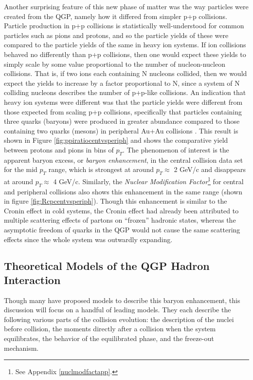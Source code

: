 Another surprising feature of this new phase of matter was the way particles were created from the QGP, namely how it differed from simpler p+p collisions. Particle production in p+p collisions is statistically well-understood for common particles such as pions and protons, and so the particle yields of these were compared to the particle yields of the same in heavy ion systems. If ion collisions behaved no differently than p+p collisions, then one would expect these yields to simply scale by some value proportional to the number of nucleon-nucleon collisions. That is, if two ions each containing N nucleons collided, then we would expect the yields to increase by a factor proportional to N, since a system of N colliding nucleons describes the number of p+p-like collisions. An indication that heavy ion systems were different was that the particle yields were different from those expected from scaling p+p collisions, specifically that particles containing three quarks (baryons) were produced in greater abundance compared to those containing two quarks (mesons) in peripheral Au+Au collisions \citep{PhysRevLett.97.152301}. This result is shown in Figure \ref{fig:ppiratiocentvsperiph} and shows the comparative yield between protons and pions in bins of $p_{T}$. The phenomenon of interest is the apparent baryon excess, or \textit{baryon enhancement}, in the central collision data set for the mid $p_{T}$ range, which is strongest at around $p_{T}\approx$ 2 GeV/c and disappears at around $p_{T}\approx$ 4 GeV/c. Similarly, the \textit{Nuclear Modification Factor}\footnote{See Appendix \ref{nuclmodfactapp}.} for central and peripheral collisions also shows this enhancement in the same range (shown in figure \ref{fig:Rcpcentvsperiph}). Though this enhancement is similar to the Cronin effect in cold systems, the Cronin effect had already been attributed to multiple scattering effects of partons on ``frozen'' hadronic states, whereas the asymptotic freedom of quarks in the QGP would not cause the same scattering effects since the whole system was outwardly expanding.

\subsection{Theoretical Models of the QGP Hadron Interaction}
Though many have proposed models to describe this baryon enhancement, this discussion will focus on a handful of leading models. They each describe the following various parts of the collision evolution: the description of the nuclei before collision, the moments directly after a collision when the system equilibrates, the behavior of the equilibrated phase, and the freeze-out mechanism.

